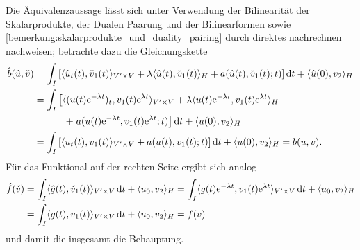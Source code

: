 \begin{Lemma}
\begin{Beweis}
        Die Äquivalenzaussage lässt sich unter Verwendung der Bilinearität der Skalarprodukte, der Dualen Paarung und der Bilinearformen sowie \cref{bemerkung:skalarprodukte_und_duality_pairing} durch direktes nachrechnen nachweisen; betrachte dazu die Gleichungskette
        \begin{equation}
            \begin{aligned}
                \hat{b}(\hat{u}, \check{v})
                &= \int_{I} \left[ \langle\hat{u}_{t}(t),\check{v}_{1}(t)\rangle_{V' \times V} + \lambda \langle\hat{u}(t),\check{v}_{1}(t)\rangle_{H} + a(\hat{u}(t), \check{v}_{1}(t); t) \right] \mathop{}\!\mathrm{d} t + \langle\hat{u}(0),v_{2}\rangle_{H}
                \\
                &= \int_{I} \left[ \langle(u(t)\mathrm{e}^{- \lambda t})_{t},v_{1}(t) \mathrm{e}^{\lambda t}\rangle_{V' \times V} + \lambda \langle u(t)\mathrm{e}^{- \lambda t},v_{1}(t)\mathrm{e}^{\lambda t}\rangle_{H} \right.
                \\&\qquad \quad
                \left. +\;a(u(t)\mathrm{e}^{- \lambda t}, v_{1}(t)\mathrm{e}^{\lambda t}; t) \right] \mathop{}\!\mathrm{d} t + \langle u(0),v_{2}\rangle_{H}
                \\
                &= \int_{I} \left[ \langle u_{t}(t),v_{1}(t)\rangle_{V' \times V} + a(u(t), v_{1}(t); t) \right] \mathop{}\!\mathrm{d} t + \langle u(0),v_{2}\rangle_{H}
                = b(u, v).
            \end{aligned}
        \end{equation}
        Für das Funktional auf der rechten Seite ergibt sich analog
        \begin{equation}
            \begin{aligned}
                \hat{f}(\check{v})
                &= \int_{I} \langle\hat{g}(t),\check{v}_{1}(t)\rangle_{V' \times V} \mathop{}\!\mathrm{d} t + \langle u_{0},v_{2}\rangle_{H}
                = \int_{I} \langle g(t)\mathrm{e}^{- \lambda t},v_{1}(t)\mathrm{e}^{\lambda t}\rangle_{V' \times V} \mathop{}\!\mathrm{d} t + \langle u_{0},v_{2}\rangle_{H}
                \\&= \int_{I} \langle g(t),v_{1}(t)\rangle_{V' \times V} \mathop{}\!\mathrm{d} t + \langle u_{0},v_{2}\rangle_{H}
                = f(v)
            \end{aligned}
        \end{equation}
        und damit die insgesamt die Behauptung.
    \end{Beweis}
\end{Lemma}
